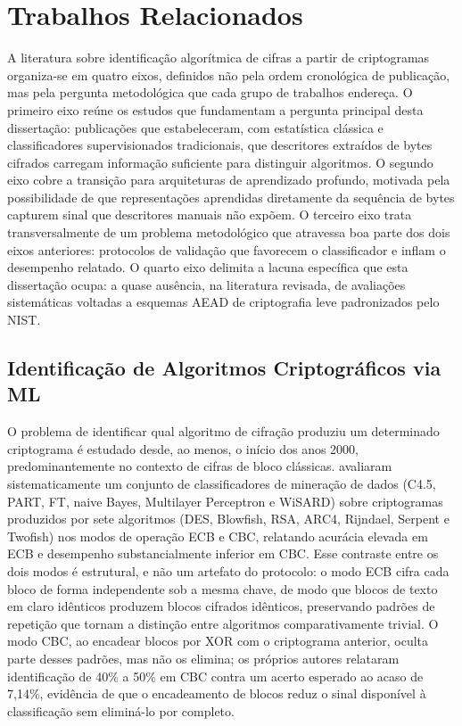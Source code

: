 \chapter{Trabalhos Relacionados}

A literatura sobre identificação algorítmica de cifras a partir de criptogramas organiza-se em quatro eixos, definidos não pela ordem cronológica de publicação, mas pela pergunta metodológica que cada grupo de trabalhos endereça. O primeiro eixo reúne os estudos que fundamentam a pergunta principal desta dissertação: publicações que estabeleceram, com estatística clássica e classificadores supervisionados tradicionais, que descritores extraídos de bytes cifrados carregam informação suficiente para distinguir algoritmos. O segundo eixo cobre a transição para arquiteturas de aprendizado profundo, motivada pela possibilidade de que representações aprendidas diretamente da sequência de bytes capturem sinal que descritores manuais não expõem. O terceiro eixo trata transversalmente de um problema metodológico que atravessa boa parte dos dois eixos anteriores: protocolos de validação que favorecem o classificador e inflam o desempenho relatado. O quarto eixo delimita a lacuna específica que esta dissertação ocupa: a quase ausência, na literatura revisada, de avaliações sistemáticas voltadas a esquemas AEAD de criptografia leve padronizados pelo NIST.

\section{Identificação de Algoritmos Criptográficos via ML}

O problema de identificar qual algoritmo de cifração produziu um determinado criptograma é estudado desde, ao menos, o início dos anos 2000, predominantemente no contexto de cifras de bloco clássicas.  avaliaram sistematicamente um conjunto de classificadores de mineração de dados (C4.5, PART, FT, naive Bayes, Multilayer Perceptron e WiSARD) sobre criptogramas produzidos por sete algoritmos (DES, Blowfish, RSA, ARC4, Rijndael, Serpent e Twofish) nos modos de operação ECB e CBC, relatando acurácia elevada em ECB e desempenho substancialmente inferior em CBC. Esse contraste entre os dois modos é estrutural, e não um artefato do protocolo: o modo ECB cifra cada bloco de forma independente sob a mesma chave, de modo que blocos de texto em claro idênticos produzem blocos cifrados idênticos, preservando padrões de repetição que tornam a distinção entre algoritmos comparativamente trivial. O modo CBC, ao encadear blocos por XOR com o criptograma anterior, oculta parte desses padrões, mas não os elimina; os próprios autores relataram identificação de 40\% a 50\% em CBC contra um acerto esperado ao acaso de 7,14\%, evidência de que o encadeamento de blocos reduz o sinal disponível à classificação sem eliminá-lo por completo.

